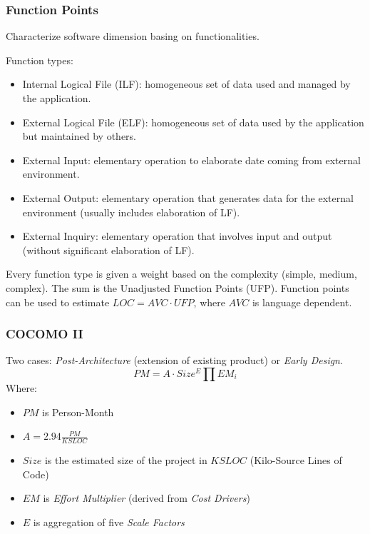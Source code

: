\subsubsection{Function Points}
Characterize software dimension basing on functionalities.

Function types:
\begin{itemize}
    \item Internal Logical File (ILF): homogeneous set of data used and managed by the application.
    \item External Logical File (ELF): homogeneous set of data used by the application but maintained by others.
    \item External Input: elementary operation to elaborate date coming from external environment.
    \item External Output: elementary operation that generates data for the external environment (usually includes elaboration of LF).
    \item External Inquiry: elementary operation that involves input and output (without significant elaboration of LF).
\end{itemize}
Every function type is given a weight based on the complexity (simple, medium, complex).
The sum is the Unadjusted Function Points (UFP).
Function points can be used to estimate $LOC = AVC \cdot UFP$, where $AVC$ is language dependent.

\subsubsection{COCOMO II}
Two cases: \emph{Post-Architecture} (extension of existing product) or \emph{Early Design}.
\[ PM = A \cdot Size^E \prod EM_i \]
Where:
\begin{itemize}
    \item $PM$ is Person-Month
    \item $A = 2.94 \frac{PM}{KSLOC}$
    \item $Size$ is the estimated size of the project in $KSLOC$ (Kilo-Source Lines of Code)
    \item $EM$ is \emph{Effort Multiplier} (derived from \emph{Cost Drivers})
    \item $E$ is aggregation of five \emph{Scale Factors}
\end{itemize}

